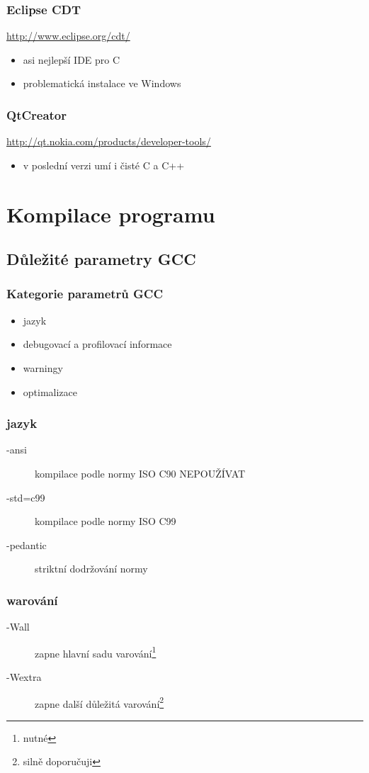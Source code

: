	\begin{frame}
		\frametitle{Eclipse CDT}
		\url{http://www.eclipse.org/cdt/}
		\begin{itemize}
			\item{asi nejlepší IDE pro C}
			\item{problematická instalace ve Windows}
		\end{itemize}
	\end{frame}

	\begin{frame}
		\frametitle{QtCreator}
		\url{http://qt.nokia.com/products/developer-tools/}
		\begin{itemize}
			\item{v poslední verzi umí i čisté C a C++}
		\end{itemize}
	\end{frame}

	\section{Kompilace programu}
	\subsection{Důležité parametry GCC}

	\begin{frame}
		\frametitle{Kategorie parametrů GCC}
		\begin{itemize}
			\item{jazyk}
			\item{debugovací a profilovací informace}
			\item{warningy}
			\item{optimalizace}
		\end{itemize}
	\end{frame}

	\begin{frame}
		\frametitle{jazyk}
		\begin{description}
			\item[-ansi]{kompilace podle normy ISO C90 \alert{NEPOUŽÍVAT}}
			\item[-std=c99]{kompilace podle normy ISO C99}
			\item[-pedantic]{striktní dodržování normy}
		\end{description}
	\end{frame}

	\begin{frame}
		\frametitle{warování}
		\begin{description}
			\item[-Wall]{zapne hlavní sadu varování\footnote{\alert{nutné}}}
			\item[-Wextra]{zapne další důležitá varování\footnote{silně doporučuji}} 
		\end{description}
	\end{frame}

